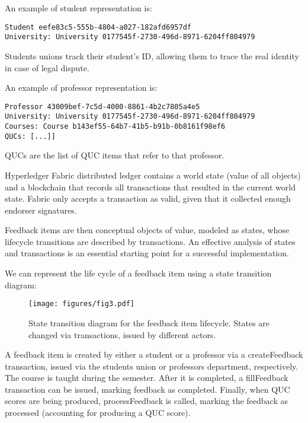 \documentclass[12pt,a4paper]{article}
\theoremstyle{definition}
\begin{document}
    An example of student representation is:
    \begin{verbatim}
Student eefe83c5-555b-4804-a027-182afd6957df
University: University 0177545f-2730-496d-8971-6204ff804979

    \end{verbatim}

    Students unions track their student's ID, allowing them to trace the real identity in case of legal dispute.

    An example of professor representation is:
    \begin{verbatim}
Professor 43009bef-7c5d-4000-8861-4b2c7805a4e5
University: University 0177545f-2730-496d-8971-6204ff804979
Courses: Course b143ef55-64b7-41b5-b91b-0b8161f98ef6
QUCs: [...]]

    \end{verbatim}

    QUCs are the list of QUC items that refer to that professor.


    Hyperledger Fabric distributed ledger contains a world state (value of all objects) and a blockchain that records all transactions that resulted in the current world state. Fabric only accepts a transaction as valid, given that it collected enough endorser signatures.

    Feedback items are then conceptual objects of value, modeled as states, whose lifecycle transitions are described by transactions. An effective analysis of states and transactions is an essential starting point for a successful implementation.

    We can represent the life cycle of a feedback item using a state transition diagram:

    \begin{figure}[h]
        \centering
        \texttt{[image: figures/fig3.pdf]}
        \caption{State transition diagram for the feedback item lifecycle. States are changed via transactions, issued by different actors.}
        \label{fig:feedback_item_lc}
    \end{figure}

    A feedback item is created by either a student or a professor via a createFeedback transaction, issued via the students union or professors department, respectively. The course is taught during the semester. After it is completed, a fillFeedback transaction can be issued, marking feedback as completed. Finally, when QUC scores are being produced, processFeedback is called, marking the feedback as processed (accounting for producing a QUC score).
\end{document}
